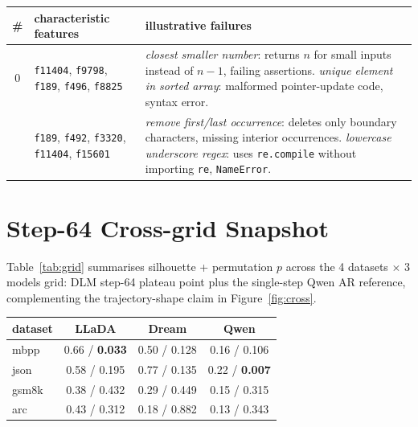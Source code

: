 \documentclass[11pt]{article}
\makeatletter
\renewcommand{\arraystretch}{0.96}
\providecommand{\linenumbers}{}
\providecommand{\nolinenumbers}{}
\let\old@table\table
\let\old@endtable\endtable
\renewenvironment{table}[1][]{%
  \nolinenumbers\old@table[#1]%
}{%
  \old@endtable\linenumbers%
}
\makeatother
\begin{document}
\begin{table}[t]
  \centering\small
  \setlength{\tabcolsep}{4pt}
  \renewcommand{\arraystretch}{1.05}
  \begin{tabular}{@{}c p{} p{}@{}}
    \toprule
    \# & characteristic features & illustrative failures \\
    \midrule
    0 & \texttt{f11404}, \texttt{f9798}, \texttt{f189}, \texttt{f496}, \texttt{f8825}
      & \emph{closest smaller number}: returns $n$ for small inputs instead of $n{-}1$, failing assertions.\newline
        \emph{unique element in sorted array}: malformed pointer-update code, syntax error. \\
    \addlinespace[2pt]
    1 & \texttt{f189}, \texttt{f492}, \texttt{f3320}, \texttt{f11404}, \texttt{f15601}
      & \emph{remove first/last occurrence}: deletes only boundary characters, missing interior occurrences.\newline
        \emph{lowercase underscore regex}: uses \texttt{re.compile} without importing \texttt{re}, \texttt{NameError}. \\
    \bottomrule
  \end{tabular}
  \caption{Illustrative generated failures from the two LLaDA-MBPP step-64 fail clusters. Error-type counts over 10 regenerated failures per cluster: cluster 0 has 3 assertion / 2 syntax / 4 name / 1 value error; cluster 1 has 5 assertion / 4 name / 1 type error.}
  \label{tab:cluster_examples}
\end{table}

\section{Step-64 Cross-grid Snapshot}
\label{sec:appendix_grid}
Table~\ref{tab:grid} summarises silhouette + permutation $p$ across the 4 datasets $\times$ 3 models grid: DLM step-64 plateau point plus the single-step Qwen AR reference, complementing the trajectory-shape claim in Figure~\ref{fig:cross}.
\begin{table}[H]
  \centering\small
  \setlength{\tabcolsep}{3.2pt}
  \begin{tabular}{lccc}
    \toprule
    dataset & LLaDA & Dream & Qwen \\
    \midrule
    mbpp & 0.66 / \textbf{0.033} & 0.50 / 0.128 & 0.16 / 0.106 \\
    json & 0.58 / 0.195 & 0.77 / 0.135 & 0.22 / \textbf{0.007} \\
    gsm8k & 0.38 / 0.432 & 0.29 / 0.449 & 0.15 / 0.315 \\
    arc & 0.43 / 0.312 & 0.18 / 0.882 & 0.13 / 0.343 \\
    \bottomrule
  \end{tabular}
  \caption{Silhouette / permutation $p$ per condition: DLM step-64 for LLaDA / Dream, single-step AR reference for Qwen; bold $p\!<\!0.05$. Full DLM trajectory in Figure~\ref{fig:cross}.}
  \label{tab:grid}
\end{table}
\end{document}
